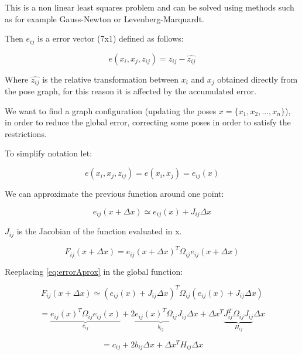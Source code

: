 This is a non linear least squares problem and can be solved using 
methods such as for example Gauss-Newton or Levenberg-Marquardt.


Then $e_{ij}$ is a error vector (7x1) defined as follows:

$$
e(x_i,x_j,z_{ij}) = z_{ij} - \hat{z_{ij}}
$$

Where $\hat{z_{ij}}$ is the relative transformation between $x_i$ and $x_j$ obtained directly from the pose graph, for this reason 
it is affected by the accumulated error.

We want to find a graph configuration (updating the poses $x=\{x_1,x_2,...,x_n\}$), in order to reduce 
the global error, correcting some poses in order to satisfy the restrictions.

To simplify notation let: 

$$
e(x_i,x_j,z_{ij}) = e(x_i,x_j) = e_{ij}(x)
$$

We can approximate the previous function around one point:

\begin{equation}
\label{eq:errorAprox}
e_{ij}(x + \Delta x) \simeq e_{ij}(x) + J_{ij} \Delta x
\end{equation}

$J_{ij}$ is the Jacobian of the function evaluated in x. 


\begin{equation}
\label{eq:globalFunc}
F_{ij}(x + \Delta x) = e_{ij}(x + \Delta x)^T \Omega_{ij}  e_{ij}(x + \Delta x)
\end{equation}

Reeplacing \ref{eq:errorAprox} in the global function:

\begin{equation}
\label{eq:globalFuncAprox}
F_{ij}(x + \Delta x) \simeq (e_{ij}(x) + J_{ij} \Delta x)^T \Omega_{ij}  (e_{ij}(x) + J_{ij} \Delta x)
\end{equation}

\begin{equation}
\label{eq:globalFuncAprox2}
 =  \underbrace{e_{ij}(x)^T \Omega_{ij} e_{ij}(x)}_{c_{ij}} + 2  \underbrace{e_{ij}(x)^T \Omega_{ij} J_{ij}}_{b_{ij}} \Delta x + \Delta x^T \underbrace{ J_{ij}^T  \Omega_{ij} J_{ij}}_{H_{ij}} \Delta x
\end{equation}

\begin{equation}
\label{eq:globalFuncAprox2}
 = c_{ij} + 2 b_{ij} \Delta x + \Delta x^T H_{ij} \Delta x
\end{equation}


